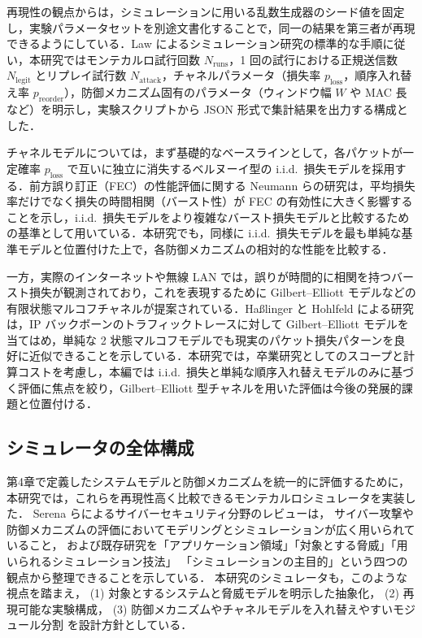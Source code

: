 \documentclass[twocolumn,10pt,a4paper]{jsarticle}
\begin{document}
再現性の観点からは，シミュレーションに用いる乱数生成器のシード値を固定し，実験パラメータセットを別途文書化することで，同一の結果を第三者が再現できるようにしている．Law によるシミュレーション研究の標準的な手順\cite{Law2007Simulation}に従い，本研究ではモンテカルロ試行回数 $N_{\mathrm{runs}}$，1 回の試行における正規送信数 $N_{\mathrm{legit}}$ とリプレイ試行数 $N_{\mathrm{attack}}$，チャネルパラメータ（損失率 $p_{\mathrm{loss}}$，順序入れ替え率 $p_{\mathrm{reorder}}$），防御メカニズム固有のパラメータ（ウィンドウ幅 $W$ や MAC 長など）を明示し，実験スクリプトから JSON 形式で集計結果を出力する構成とした．

チャネルモデルについては，まず基礎的なベースラインとして，各パケットが一定確率 $p_{\mathrm{loss}}$ で互いに独立に消失するベルヌーイ型の i.i.d.\ 損失モデルを採用する．前方誤り訂正（FEC）の性能評価に関する Neumann らの研究\cite{Neumann2005FEC}は，平均損失率だけでなく損失の時間相関（バースト性）が FEC の有効性に大きく影響することを示し，i.i.d.\ 損失モデルをより複雑なバースト損失モデルと比較するための基準として用いている．本研究でも，同様に i.i.d.\ 損失モデルを最も単純な基準モデルと位置付けた上で，各防御メカニズムの相対的な性能を比較する．

一方，実際のインターネットや無線 LAN では，誤りが時間的に相関を持つバースト損失が観測されており，これを表現するために Gilbert--Elliott モデルなどの有限状態マルコフチャネルが提案されている．Ha{\ss}linger と Hohlfeld による研究\cite{Hasslinger2008GE}は，IP バックボーンのトラフィックトレースに対して Gilbert--Elliott モデルを当てはめ，単純な 2 状態マルコフモデルでも現実のパケット損失パターンを良好に近似できることを示している．本研究では，卒業研究としてのスコープと計算コストを考慮し，本編では i.i.d.\ 損失と単純な順序入れ替えモデルのみに基づく評価に焦点を絞り，Gilbert--Elliott 型チャネルを用いた評価は今後の発展的課題と位置付ける．

\subsection{シミュレータの全体構成}

第4章で定義したシステムモデルと防御メカニズムを統一的に評価するために，
本研究では，これらを再現性高く比較できるモンテカルロシミュレータを実装した．
Serena らによるサイバーセキュリティ分野のレビュー\cite{Serena2025SimCyber}は，
サイバー攻撃や防御メカニズムの評価においてモデリングとシミュレーションが広く用いられていること，
および既存研究を「アプリケーション領域」「対象とする脅威」「用いられるシミュレーション技法」
「シミュレーションの主目的」という四つの観点から整理できることを示している．
本研究のシミュレータも，このような視点を踏まえ，
(1) 対象とするシステムと脅威モデルを明示した抽象化，
(2) 再現可能な実験構成，
(3) 防御メカニズムやチャネルモデルを入れ替えやすいモジュール分割
を設計方針としている．
\end{document}
